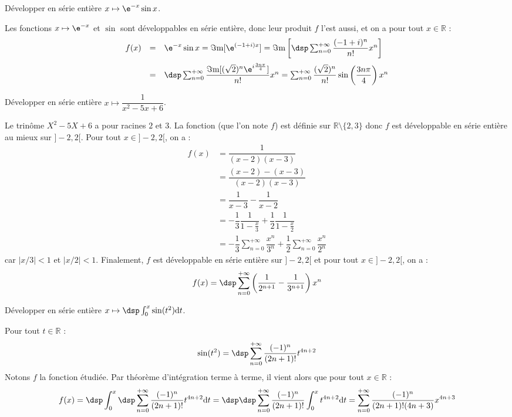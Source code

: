 \documentclass[a4paper,10pt]{report}
\begin{document}
\begin{Exa} Développer en série entière $x \mapsto \e^{-x}\sin x$.
\end{Exa}

\corr Les fonctions $x\mapsto\e^{-x}$ et $\sin$ sont développables en série entière, donc leur produit $f$ l'est aussi, et on a pour tout $x\in\mathbb{R}$ : 
\[
\begin{array}{rcl}
f(x) &= & \e^{-x}\sin x=\Im\mathrm{m}[\e^{(-1+i)x}]=\Im\mathrm{m}\left[\dsp\sum_{n=0}^{+\infty}\dfrac{(-1+i)^n}{n!}x^n\right]\\
\vspace*{-0.2cm}\\
& = & \dsp\sum_{n=0}^{+\infty}\dfrac{\Im\mathrm{m}[(\sqrt{2})^n\e^{i\frac{3n\pi}{4}}]}{n!}x^n=\sum_{n=0}^{+\infty}\dfrac{(\sqrt{2})^n}{n!}\sin\left(\dfrac{3n\pi}{4}\right)x^n
\end{array}
\]

\begin{Exa} Développer en série entière $x \mapsto \dfrac{1}{x^2-5x+6}$.
\end{Exa}

\corr Le trinôme $X^2-5X+6$ a pour racines $2$ et $3$. La fonction (que l'on note $f$) est définie sur $\mathbb{R} \setminus \lbrace 2,3 \rbrace$ donc $f$ est développable en série entière au mieux sur $]-2,2[$. Pour tout $x \in ]-2,2[$, on a :
\begin{align*}
f(x) & = \dfrac{1}{(x-2)(x-3)}\\
&  = \dfrac{(x-2)-(x-3)}{(x-2)(x-3)}  \\
& = \dfrac{1}{x-3} - \dfrac{1}{x-2} \\
& = -\dfrac{1}{3}\dfrac{1}{1-\frac{x}{3}}+\dfrac{1}{2}\dfrac{1}{1-\frac{x}{2}} \\
& =-\dfrac{1}{3}\sum_{n=0}^{+\infty}\dfrac{x^n}{3^n}+\dfrac{1}{2}\sum_{n=0}^{+\infty}\dfrac{x^n}{2^n}
\end{align*} 
car $\vert x/3 \vert <1$ et $\vert x/2 \vert <1$. Finalement, $f$ est développable en série entière sur $]-2,2[$ et pour tout $x \in ]-2,2[$, on a :
$$ f(x) = \dsp\sum_{n=0}^{+\infty}\left(  \dfrac{1}{2^{n+1}}-\dfrac{1}{3^{n+1}}\right)x^n$$

\begin{Exa} Développer en série entière $x \mapsto \dsp\int_0^x\sin(t^2)\mathrm{d}t$.
\end{Exa}

\corr Pour tout $t\in\mathbb{R}$ : 
\[
\sin(t^2)=\dsp\sum_{n=0}^{+\infty}\dfrac{(-1)^n}{(2n+1)!}t^{4n+2}
\]
Notons $f$ la fonction étudiée. Par théorème d'intégration terme à terme, il vient alors que pour tout $x\in\mathbb{R}$ : 
$$f(x)=\dsp\int_0^x\dsp\sum_{n=0}^{+\infty}\dfrac{(-1)^n}{(2n+1)!}t^{4n+2}\mathrm{d}t=\dsp\dsp\sum_{n=0}^{+\infty}\dfrac{(-1)^n}{(2n+1)!}\int_0^xt^{4n+2}\mathrm{d}t=\sum_{n=0}^{+\infty}\dfrac{(-1)^n}{(2n+1)!(4n+3)}x^{4n+3}$$
\end{document}
